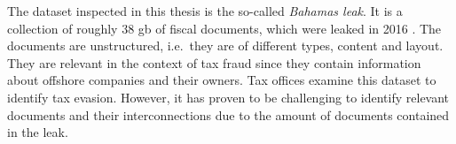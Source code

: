 The dataset inspected in this thesis is the so-called \textit{Bahamas leak}.
It is a collection of roughly 38 \ac{gb} of fiscal documents, 
which were leaked in 2016 \cite{data-corpus-bahamas-leaks}.
The documents are unstructured, i.e.\ they are of different types, content and layout.
They are relevant in the context of tax fraud since they contain information about offshore companies and their owners.
Tax offices examine this dataset to identify tax evasion.
However, it has proven to be challenging to identify relevant documents and their interconnections due to the amount of documents contained in the leak.